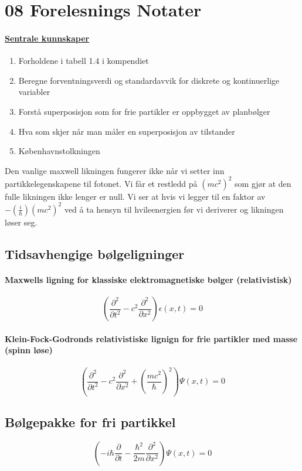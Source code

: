 \section{08 Forelesnings Notater}
\paragraph{\underline{Sentrale kunnskaper}}
\begin{enumerate}
    \item Forholdene i tabell 1.4 i kompendiet 
    \item Beregne forventningsverdi og standardavvik for diskrete og kontinuerlige variabler
    
    \item Forstå superposisjon som for frie partikler er oppbygget av planbølger
    \item Hva som skjer når man måler en superposisjon av tilstander 
    \item Københavnstolkningen 
\end{enumerate}

Den vanlige maxwell likningen fungerer ikke når vi setter inn partikkelegenskapene til fotonet. Vi får et restledd på $\displaystyle \left( mc^2 \right) ^2$ som gjør at den fulle likningen ikke lenger er null. Vi ser at hvis vi legger til en faktor av $\displaystyle - \left( \frac{i}{ℏ} \right) \left( mc^2 \right) ^2$ ved å ta hensyn til hvileenergien før vi deriverer og likningen løser seg. 

\subsection{Tidsavhengige bølgeligninger}
\paragraph{Maxwells ligning for klassiske elektromagnetiske bølger (relativistisk)}
\[
\left( \frac{∂^2 }{∂ t^2} - c^2 \frac{∂^2 }{∂ x^2} \right) ϵ(x,t) = 0
\]
\paragraph{Klein-Fock-Godronds relativistiske lignign for frie partikler med masse (spinn løse)}
\[
    \left(\frac{∂^2 }{∂ t^2} - c^2 \frac{∂^2 }{∂ x^2} + \left(\frac{mc^2}{ℏ}\right)^2\right) Ψ(x,t) = 0
\]

\subsection{Bølgepakke for fri partikkel}
\[
\left(-i ℏ \frac{∂ }{∂ t} - \frac{ℏ^2}{2m} \frac{∂^2 }{∂ x^2} \right) Ψ(x,t) = 0
\]
